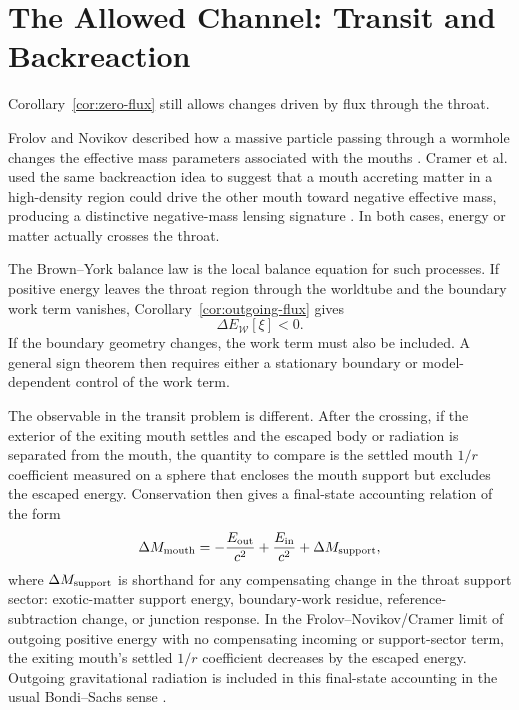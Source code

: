 \documentclass[aps,prd,10pt,onecolumn,nofootinbib,superscriptaddress,floatfix]{revtex4-2}
\begin{document}
\section{The Allowed Channel: Transit and Backreaction}
\label{sec:transit}

Corollary~\ref{cor:zero-flux} still allows changes driven by flux
through the throat.

Frolov and Novikov described how a massive particle passing through a wormhole
changes the effective mass parameters associated with the mouths
\cite{FrolovNovikov1990PhysicalEffects}.  Cramer et al. used the same
backreaction idea to suggest that a mouth accreting matter in a high-density
region could drive the other mouth toward negative effective mass, producing a
distinctive negative-mass lensing signature
\cite{CramerEtAl1995NaturalWormholes}.  In both cases, energy or matter
actually crosses the throat.

The Brown--York balance law is the local balance equation for such processes.
If positive energy leaves the throat region through the worldtube and the
boundary work term vanishes, Corollary~\ref{cor:outgoing-flux} gives
\begin{equation}
  \Delta E_{\mathcal W}[\xi]<0.
\end{equation}
If the boundary geometry changes, the work term must also be included.  A
general sign theorem then requires either a stationary boundary or
model-dependent control of the work term.

The observable in the transit problem is different.  After the crossing, if the
exterior of the exiting mouth settles and the escaped body or radiation is
separated from the mouth, the quantity to compare is the settled mouth $1/r$
coefficient measured on a sphere that encloses the mouth support but excludes
the escaped energy.  Conservation then gives a final-state accounting relation
of the form
\begin{equation}
  \Delta M_{\rm mouth}
  =
  -\frac{E_{\rm out}}{c^2}
  +\frac{E_{\rm in}}{c^2}
  +\Delta M_{\rm support},
\end{equation}
where $\Delta M_{\rm support}$ is shorthand for any compensating change in the
throat support sector: exotic-matter support energy, boundary-work residue,
reference-subtraction change, or junction response.  In the
Frolov--Novikov/Cramer limit of outgoing positive energy with no compensating
incoming or support-sector term, the exiting mouth's settled $1/r$ coefficient
decreases by the escaped energy.  Outgoing gravitational radiation is included
in this final-state accounting in the usual Bondi--Sachs sense
\cite{BondiVanderBurgMetzner1962Gravitational,Sachs1962Asymptotic}.
\end{document}
